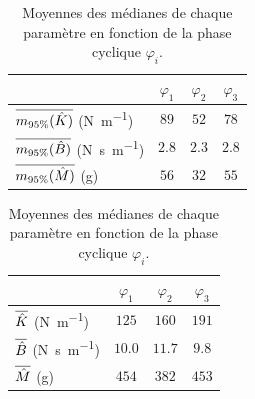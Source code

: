 \begin{table}
	\parbox{.45\linewidth}{
		\centering
		\begin{tabular}{| l | c  c  c |} 
			\hline
			\hline
			& $\varphi_1$ & $\varphi_2$ & $\varphi_3$\\ \hline
			$\overline{m_{95\%}(\hat{K})}$ (\si{\newton\per\meter}) & $89$ &  $52$ & $78$\\
			$\overline{m_{95\%}(\hat{B})}$ (\si{\newton\second\per\meter}) & $2.8$ &  $2.3$ & $2.8$\\
			$\overline{m_{95\%}(\hat{M})}$ (\si{\gram}) & $56$ &  $32$ & $55$\\\hline
		\end{tabular} %
		\caption[Intervalles de confiance moyens des paramètres estimés en fonction de la phase cyclique]{Intervalles de confiance ($m_{95\%}$) moyens des médianes de chaque paramètre en fonction de la phase cyclique $\varphi_i$.}
		\label{tab_impedance_param_average_notch}
	}
	\hfill	
	\parbox{.45\linewidth}{
		\centering
		\begin{tabular}{| l | c  c  c |} 
			\hline
			& $\varphi_1$ & $\varphi_2$ & $\varphi_3$\\ \hline
			$\overline{\hat{K}}$ (\si{\newton\per\meter}) & $125$ &  $160$ & $191$\\
			$\overline{\hat{B}}$ (\si{\newton\second\per\meter}) & $10.0$ &  $11.7$ & $9.8$\\
			$\overline{\hat{M}}$ (\si{\gram}) & $454$ &  $382$ & $453$\\\hline
		\end{tabular} %
		\caption[Paramètres moyens estimés en fonction de la phase cyclique]{Moyennes des médianes de chaque paramètre en fonction de la phase cyclique $\varphi_i$.}
		\label{tab_impedance_param_average}
	}
\end{table}


